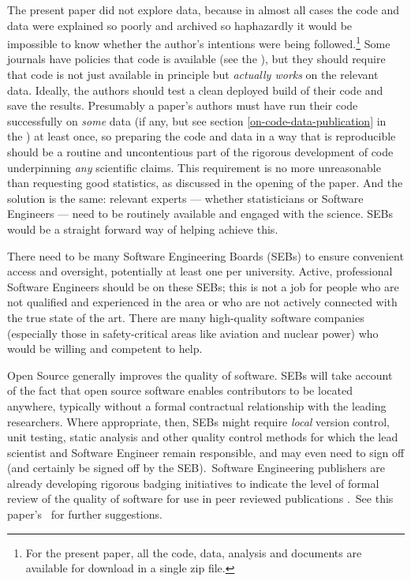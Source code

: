\documentclass{comjnl}
\begin{document}
{The present paper did not explore data, because in almost all cases the code and data were explained so poorly and archived so haphazardly it would be impossible to know whether the author's intentions were being followed.\footnote{{For the present paper, all the code, data, analysis and documents are available for download in a single zip file.}} Some journals have policies that code is available (see the \supplement), but they should require that code is not just available in principle but \emph{actually works\/} on the relevant data. Ideally, the authors should test a clean deployed build of their code and save the results. Presumably a paper's authors must have run their code successfully on \emph{some\/} data (if any, but see section \ref{on-code-data-publication} in the \supplement) at least once, so preparing the code and data in a way that is reproducible should be a routine and uncontentious part of the rigorous development of  code underpinning \emph{any\/} scientific claims. This requirement is no more unreasonable than requesting good statistics, as discussed in the opening of the paper. And the solution is the same: relevant experts --- whether statisticians or Software Engineers --- need to be routinely available and engaged with the science. SEBs would be a straight forward way of helping achieve this.}

There need to be many Software Engineering Boards (SEBs) to ensure convenient access and oversight, potentially at least one per university. Active, professional Software Engineers should be on these SEBs; this is not a job for people who are not qualified and experienced in the area or who are not actively connected with the true state of the art. There are many high-quality software companies (especially those in safety-critical areas like aviation and nuclear power) who would be willing and competent to help.

Open Source generally improves the quality of software. SEBs will take account of the fact that open source software enables contributors to be located anywhere, typically without a formal contractual relationship with the leading researchers. Where appropriate, then, SEBs might require \emph{local\/} version control, unit testing, static analysis {and other quality control methods for which the lead scientist and Software Engineer remain responsible, and may even need to sign off (and certainly be signed off by the SEB\@).}\ {Software Engineering publishers are already developing rigorous badging initiatives to indicate the level of formal review of the quality of software for use in peer reviewed publications \cite{acm-artifacts}.}\ {See this paper's \supplement\ for further suggestions.}
\end{document}
